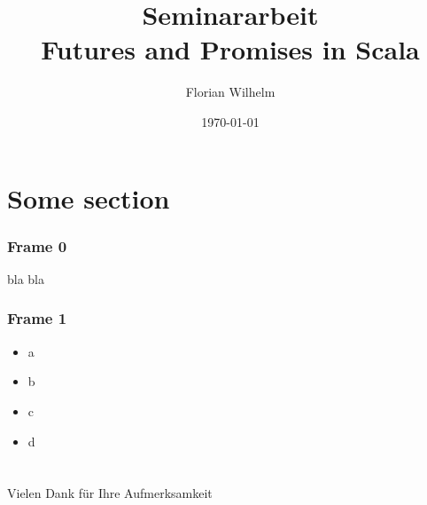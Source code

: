 \documentclass{beamer}
\title[]{Seminararbeit\\Futures and Promises in Scala}
\author{Florian Wilhelm}
\date{\today{}}
\begin{document}
\frame{
\titlepage
}


\section{Some section}

\setcounter{subsection}{1}
\begin{frame}
  \frametitle{Frame 0}
  bla bla
\end{frame}

\setcounter{subsection}{1}
\begin{frame}
  \frametitle{Frame 1}
   \begin{itemize}
    \item{a}
    \item{b}
    \item{c}
    \item{d}
   \end{itemize}
\end{frame}

\section{}
\begin{frame}
  Vielen Dank für Ihre Aufmerksamkeit
\end{frame}
\end{document}
